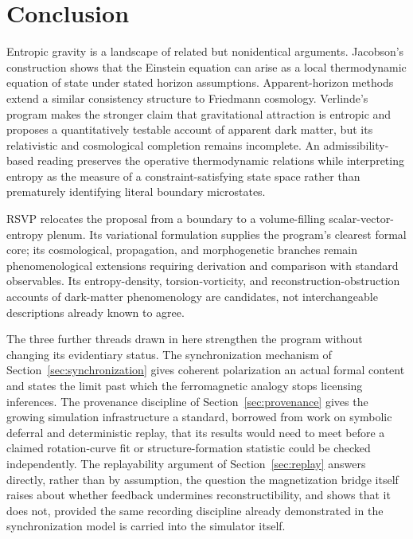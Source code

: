 \documentclass[11pt]{article}
\begin{document}
\section{Conclusion}
\label{sec:conclusion}

Entropic gravity is a landscape of related but nonidentical arguments. Jacobson's construction shows that the Einstein equation can arise as a local thermodynamic equation of state under stated horizon assumptions. Apparent-horizon methods extend a similar consistency structure to Friedmann cosmology. Verlinde's program makes the stronger claim that gravitational attraction is entropic and proposes a quantitatively testable account of apparent dark matter, but its relativistic and cosmological completion remains incomplete. An admissibility-based reading preserves the operative thermodynamic relations while interpreting entropy as the measure of a constraint-satisfying state space rather than prematurely identifying literal boundary microstates.

RSVP relocates the proposal from a boundary to a volume-filling scalar-vector-entropy plenum. Its variational formulation supplies the program's clearest formal core; its cosmological, propagation, and morphogenetic branches remain phenomenological extensions requiring derivation and comparison with standard observables. Its entropy-density, torsion-vorticity, and reconstruction-obstruction accounts of dark-matter phenomenology are candidates, not interchangeable descriptions already known to agree.

The three further threads drawn in here strengthen the program without changing its evidentiary status. The synchronization mechanism of Section~\ref{sec:synchronization} gives coherent polarization an actual formal content and states the limit past which the ferromagnetic analogy stops licensing inferences. The provenance discipline of Section~\ref{sec:provenance} gives the growing simulation infrastructure a standard, borrowed from work on symbolic deferral and deterministic replay, that its results would need to meet before a claimed rotation-curve fit or structure-formation statistic could be checked independently. The replayability argument of Section~\ref{sec:replay} answers directly, rather than by assumption, the question the magnetization bridge itself raises about whether feedback undermines reconstructibility, and shows that it does not, provided the same recording discipline already demonstrated in the synchronization model is carried into the simulator itself.
\end{document}
